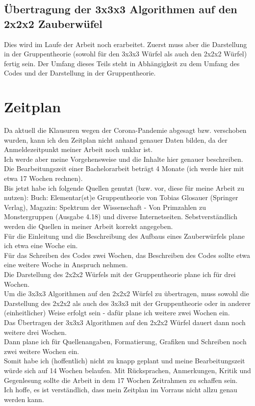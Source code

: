 \documentclass[12pt,a4paper, usenames, dvipsnames]{scrartcl}
\begin{document}
\subsection*{Übertragung der 3x3x3 Algorithmen auf den 2x2x2 Zauberwüfel}

Dies wird im Laufe der Arbeit noch erarbeitet. Zuerst muss aber die Darstellung in der Gruppentheorie (sowohl für den 3x3x3 Würfel als auch den 2x2x2 Würfel) fertig sein. Der Umfang dieses Teils steht in Abhängigkeit zu dem Umfang des Codes und der Darstellung in der Gruppentheorie. \\

\newpage


\section{Zeitplan}
Da aktuell die Klausuren wegen der Corona-Pandemie abgesagt bzw. verschoben wurden, kann ich den Zeitplan nicht anhand genauer Daten bilden, da der Anmeldezeitpunkt meiner Arbeit noch unklar ist. \\
Ich werde aber meine Vorgehensweise und die Inhalte hier genauer beschreiben. \\
Die Bearbeitungszeit einer Bachelorarbeit beträgt 4 Monate (ich werde hier mit etwa 17 Wochen rechnen). \\
Bis jetzt habe ich folgende Quellen genutzt (bzw. vor, diese für  meine Arbeit zu nutzen): Buch: Elementar(st)e Gruppentheorie von Tobias Glosauer (Springer Verlag), Magazin: Spektrum der Wissenschaft - Von Primzahlen zu Monstergruppen (Ausgabe 4.18) und diverse Internetseiten. Sebstverständlich werden die Quellen in meiner Arbeit korrekt angegeben. \\
Für die Einleitung und die Beschreibung des Aufbaus eines Zauberwürfels plane ich etwa eine Woche ein. \\
Für das Schreiben des Codes zwei Wochen, das Beschreiben des Codes sollte etwa eine weitere Woche in Anspruch nehmen. \\
Die Darstellung des 2x2x2 Würfels mit der Gruppentheorie plane ich für drei Wochen. \\
Um die 3x3x3 Algorithmen auf den 2x2x2 Würfel zu übertragen, muss sowohl die Darstellung des 2x2x2 als auch des 3x3x3 mit der Gruppentheorie oder in anderer (einheitlicher) Weise erfolgt sein - dafür plane ich weitere zwei Wochen ein. \\
Das Übertragen der 3x3x3 Algorithmen auf den 2x2x2 Würfel dauert dann noch weitere drei Wochen. \\
Dann plane ich für Quellenangaben, Formatierung, Grafiken und Schreiben noch zwei weitere Wochen ein. \\
Somit habe ich (hoffentlich) nicht zu knapp geplant und meine Bearbeitungszeit würde sich auf 14 Wochen belaufen. Mit Rücksprachen, Anmerkungen, Kritik und Gegenlesung sollte die Arbeit in dem 17 Wochen Zeitrahmen zu schaffen sein. \\ 
Ich hoffe, es ist verständlich, dass mein Zeitplan im Vorraus nicht allzu genau werden kann. \\
\end{document}
